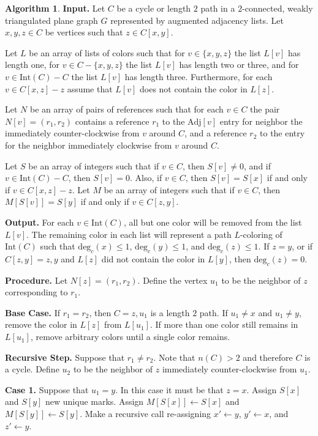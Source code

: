 \documentclass[12pt,letterpaper]{article}
\theoremstyle{plain}
\theoremstyle{definition}
\theoremstyle{break}
\newtheorem{algorithm}[lemma]{Algorithm}     %
\begin{document}
\begin{algorithm}\label{A:hartman_impl}
\textbf{Input.} Let $C$ be a cycle or length $2$ path in a
$2$-connected, weakly triangulated plane graph $G$
represented by augmented adjacency lists. Let $x,y,z\in C$ be
vertices such that $z\in C[x,y]$.

Let $L$ be an array of lists of colors
such that for $v\in\{x,y,z\}$ the list $L[v]$ has length one,
for $v\in C-\{x,y,z\}$ the list $L[v]$ has length two
or three, and for $v\in \text{Int}(C)-C$ the list
$L[v]$ has length three. Furthermore, for each $v\in C[x,z] - z$ assume
that $L[v]$ does not contain the color in $L[z]$.

Let $N$ be an array of pairs of
references such that for each $v\in C$ the pair $N[v]=(r_1,r_2)$ contains
a reference $r_1$ to the $\text{Adj}[v]$ entry for neighbor the
immediately counter-clockwise
from $v$
around $C$, and a reference $r_2$
to the entry for the neighbor immediately clockwise from $v$ around $C$.

Let $S$ be an array of
integers such that if $v\in C$, then $S[v]\ne 0$, and if
$v\in \text{Int}(C)-C$, then $S[v]=0$. Also, if
$v\in C$, then $S[v]=S[x]$ if and only if $v\in C[x,z]-z$. Let $M$
be an array of integers such that if $v\in C$, then $M[S[v]]=S[y]$
if and only if $v\in C[z,y]$.

\textbf{Output.} For each $v\in\text{Int}(C)$, all but one color will be
removed from the list $L[v]$. The remaining color in each list will represent
a path $L$-coloring of $\text{Int}(C)$
such that $\text{deg}_c(x)\le1$, $\text{deg}_c(y)\le1$, and
$\text{deg}_c(z)\le1$. If $z=y$, or if $C[z,y]=z,y$ and $L[z]$ did
not contain the color in $L[y]$, then $\text{deg}_c(z)=0$.

\textbf{Procedure.} Let $N[z]=(r_1,r_2)$. Define the vertex $u_1$ to be
the neighbor of $z$ corresponding to $r_1$.

\textbf{Base Case.} If $r_1=r_2$, then $C=z,u_1$
is a length $2$ path. If $u_1\ne x$ and $u_1\ne y$, remove the
color in $L[z]$ from $L[u_1]$. If more than one color still remains in
$L[u_1]$, remove arbitrary colors until a single color remains.

\textbf{Recursive Step.} Suppose that $r_1\ne r_2$. Note that
$n(C)>2$ and therefore $C$ is a cycle. Define $u_2$ to be the
neighbor of $z$ immediately counter-clockwise from $u_1$.

\textbf{Case 1.} Suppose that $u_1=y$. In this case it must be that
$z=x$. Assign
$S[x]$ and $S[y]$ new unique marks. Assign $M[S[x]]\leftarrow S[x]$
and $M[S[y]]\leftarrow S[y]$. Make a recursive call re-assigning
$x'\leftarrow y$, $y'\leftarrow x$, and $z'\leftarrow y$.


\end{algorithm}
\end{document}
